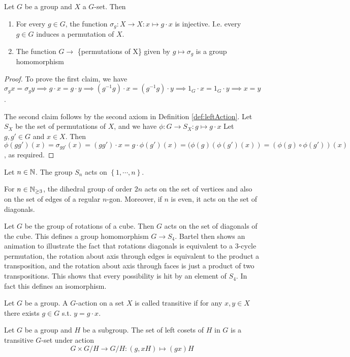 \begin{theorem}
  Let $G$ be a group and $X$ a $G$-set. Then
  \begin{enumerate}
    \item For every $g\in G$, the function $\sigma_g:X\to X:x\mapsto g\cdot x$ is
      injective. I.e. every $g\in G$ induces a permutation of $X$.
    \item The function $G\to $ \{permutations of X\} given by $g\mapsto\sigma_g$ is a
      group homomorphism
  \end{enumerate}
  \label{<+label+>}
\end{theorem}
\begin{proof}
  To prove the first claim, we have $\sigma_g x = \sigma_g y \implies g\cdot x= g\cdot y
  \implies (g^{-1}g)\cdot x = (g^{-1}g)\cdot y \implies 1_G\cdot x = 1_G\cdot y \implies
  x=y$.
  
  The second claim follows by the second axiom in Definition \ref{def:leftAction}. Let
  $S_X$ be the set of permutations of $X$, and we have $\phi:G\to S_X: g\mapsto g\cdot x$ Let $g,g'\in G$ and $x \in X$.
  Then $\phi(gg')(x) = \sigma_{gg'}(x)= (gg')\cdot x = g\cdot \phi (g')(x) = (\phi(g)(\phi (g')(x)) = (\phi(g) \circ \phi(g'))(x)$,
  as required.
\end{proof}

\begin{example}
  Let $n\in\mathbb N$. The group $S_n$ acts on $\left\{ 1,\cdots, n \right\}$.

  For $n\in\mathbb N_{\geq 3}$, the dihedral group of order $2n$ acts on the set of vertices and
  also on the set of edges of a regular $n$-gon. Moreover, if $n$ is even, it acts on the
  set of diagonals.

  Let $G$ be the group of rotations of a cube. Then $G$ acts on the set of diagonals of
  the cube. This defines a group homomorphism $G\to S_4$. Bartel then shows an animation
  to illustrate the fact that rotations diagonals is equivalent to a $3$-cycle
  permutation, the rotation about axis through edges is equivalent to the product a
  transposition, and the rotation about axis through faces is just a product of two
  transpositions. This shows that every possibility is hit by an element of $S_4$. In fact
  this defines an isomorphism.
\end{example}

\begin{definition}
  Let $G$ be a group. A $G$-action on a set $X$ is called transitive if for any $x,y\in X$
  there exists $g\in G$ s.t. $y=g\cdot x$.
  \label{def:transitiveAction}
\end{definition}
\begin{example}
  Let $G$ be a group and $H$ be a subgroup. The set of left cosets of $H$ in $G$ is a
  transitive $G$-set under action
  \[G\times G/H \to G/H: (g,xH)\mapsto (gx)H\]
\end{example}

